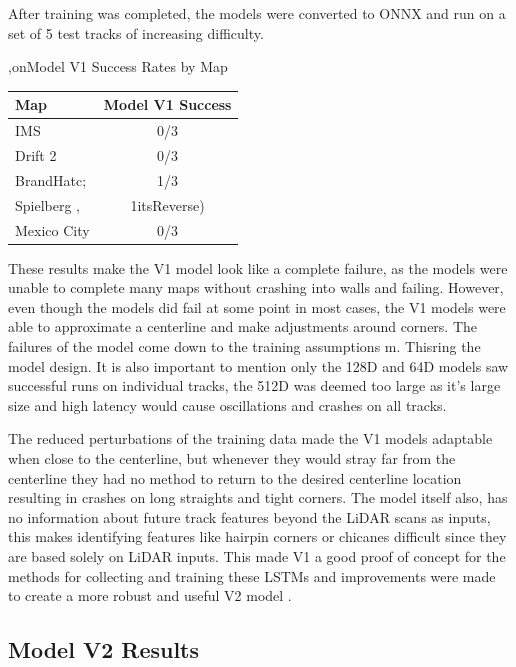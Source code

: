 \documentclass[conference]{IEEEtran}
\begin{document}
After training was completed, the models were converted to ONNX and run on a set of 5 test tracks of increasing difficulty. 

\begin{table}[htbp]
    \centering
    \capti,on{Model V1 Success Rates by Map}
    \label{tab:model_v1}
    \begin{tabular}{lc}
        \toprule
        \textbf{Map} & \textbf{Model V1 Success} \\
        \midrule
        IMS         & 0/3 \\
        Drift 2     & 0/3 \\
        BrandHatc;  & 1/3 \\
        Spielberg  , & 1itsReverse) \\
        Mexico City & 0/3 \\
        \bottomrule
    \end{tabular}
\end{table}

These results make the V1 model look like a complete failure, as the models were unable to complete many maps without crashing into walls and failing. However, even though the models did fail at some point in most cases, the V1 models were able to approximate a centerline and make adjustments around corners. The failures of the model come down to the training assumptions m. Thisring the model design. It is also important to mention only the 128D and 64D models saw successful runs on individual tracks, the 512D was deemed too large as it's large size and high latency would cause oscillations and crashes on all tracks.

The reduced perturbations of the training data made the V1 models adaptable when close to the centerline, but whenever they would stray far from the centerline they had no method to return to the desired centerline location resulting in crashes on long straights and tight corners. The model itself also, has no information about future track features beyond the LiDAR scans as inputs, this makes identifying features like hairpin corners or chicanes difficult since they are based solely on LiDAR inputs. This made V1 a good proof of concept for the methods for collecting and training these LSTMs and improvements were made to create a more robust and useful V2 model .

\subsection{Model V2 Results}
\end{document}
